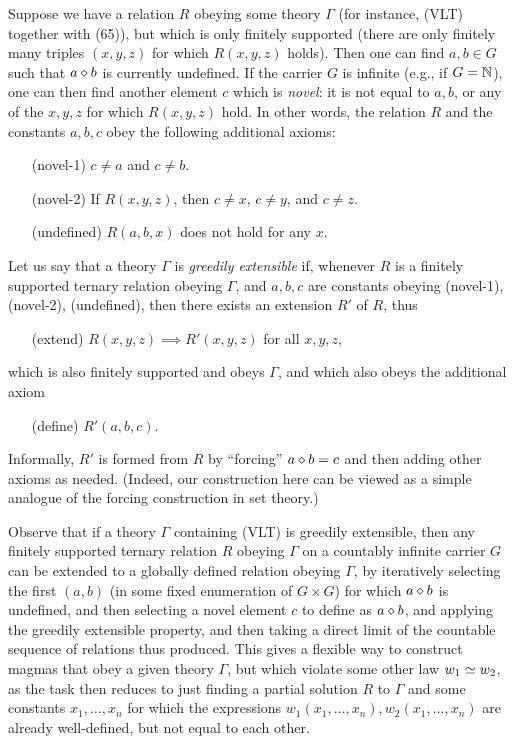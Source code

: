 Suppose we have a relation $R$ obeying some theory $\Gamma$ (for instance, (VLT) together with (65)), but which is only finitely supported (there are only finitely many triples $(x,y,z)$ for which $R(x,y,z)$ holds).  Then one can find $a,b \in G$ such that $a \diamond b$ is currently undefined.  If the carrier $G$ is infinite (e.g., if $G = \mathbb{N}$), one can then find another element $c$ which is \emph{novel}: it is not equal to $a, b$, or any of the $x,y,z$ for which $R(x,y,z)$ hold. In other words, the relation $R$ and the constants $a,b,c$ obey the following additional axioms:
\begin{itemize}
  \item[(novel-1)] $c \neq a$ and $c \neq b$.
  \item[(novel-2)] If $R(x,y,z)$, then $c \neq x$, $c \neq y$, and $c \neq z$.
  \item[(undefined)]  $R(a,b,x)$ does not hold for any $x$.
\end{itemize}

Let us say that a theory $\Gamma$ is \emph{greedily extensible} if, whenever $R$ is a finitely supported ternary relation obeying $\Gamma$, and $a,b,c$ are constants obeying (novel-1), (novel-2), (undefined), then there exists an extension $R'$ of $R$, thus
\begin{itemize}
  \item[(extend)] $R(x,y,z) \implies R'(x,y,z)$ for all $x,y,z$,
\end{itemize}
which is also finitely supported and obeys $\Gamma$, and which also obeys the additional axiom
\begin{itemize}
  \item[(define)] $R'(a,b,c)$.
\end{itemize}
Informally, $R'$ is formed from $R$ by ``forcing'' $a \diamond b = c$ and then adding other axioms as needed. (Indeed, our construction here can be viewed as a simple analogue of the forcing construction in set theory.)

Observe that if a theory $\Gamma$ containing (VLT) is greedily extensible, then any finitely supported ternary relation $R$ obeying $\Gamma$ on a countably infinite carrier $G$ can be extended to a globally defined relation obeying $\Gamma$, by iteratively selecting the first $(a,b)$ (in some fixed enumeration of $G \times G$) for which $a \diamond b$ is undefined, and then selecting a novel element $c$ to define as $a \diamond b$, and applying the greedily extensible property, and then taking a direct limit of the countable sequence of relations thus produced.  This gives a flexible way to construct magmas that obey a given theory $\Gamma$, but which violate some other law $w_1 \simeq w_2$, as the task then reduces to just finding a partial solution $R$ to $\Gamma$ and some constants $x_1,\dots,x_n$ for which the expressions $w_1(x_1,\dots,x_n), w_2(x_1,\dots,x_n)$ are already well-defined, but not equal to each other.

